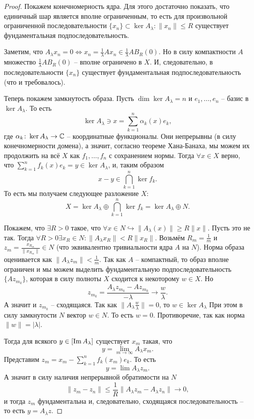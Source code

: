 \begin{proof}
    Покажем конечномерность ядра.
    Для этого достаточно показать, что единичный шар является вполне ограниченным, то есть для произвольной ограниченной последовательности $\{x_n\} \subset \ker A_\lambda\colon \|x_n\| \leq R$ существует фундаментальная подпоследовательность.

    Заметим, что $A_\lambda x_n = 0 \Longleftrightarrow x_n = \frac{1}{\lambda}Ax_n \in \frac{1}{\lambda} AB_R(0)$.
    Но в силу компактности $A$ множество $\frac{1}{\lambda}AB_R(0)$ -- вполне ограничено в $X$.
    И, следовательно, в последовательности $\{x_n\}$ существует фундаментальная подпоследовательность (что и требовалось).

    Теперь покажем замкнутость образа.
    Пусть $\dim \ker A_\lambda = n$ и $e_1, \ldots, e_n$ -- базис в $\ker A_\lambda$.
    То есть 
    \[
        \ker A_\lambda \ni x = \sum_{k = 1}^{n}\alpha_k(x)e_k,
    \]
    где $\alpha_k\colon \ker A_\lambda \to \mathbb{C}$ -- координатные функционалы.
    Они непрерывны (в силу конечномерности домена), а значит, согласно теореме Хана-Банаха, мы можем их продолжить на всё $X$ как $f_1, \ldots, f_n$ с сохранением нормы.
    Тогда $\forall x \in X$ верно, что $\sum_{k = 1}^n f_k(x)e_k = y \in \ker A_\lambda$,
    и, таким образом
    \[
        x - y \in \bigcap_{k = 1}^{n} \ker f_k.
    \]
    То есть мы получаем следующее разложение $X$:
    \[
        X = \ker A_\lambda \oplus \bigcap_{k = 1}^{n} \ker f_k = \ker A_\lambda \oplus N.
    \]
    
    Покажем, что $\exists R > 0$ такое, что $\forall x \in N \hookrightarrow \|A_\lambda(x)\| \geq R\|x\|$. Пусть это не так.
    Тогда $\forall R > 0 \exists x_R \in N\colon \|A_\lambda x_R\| < R\|x_R\|$.
    Возьмём $R_m = \frac{1}{m}$ и $z_m = \frac{x_{R_m}}{\|x_{R_m}\|} \in N$ (что эквивалентно тривиальности ядра $A$ на $N$).
    Норма образа оценивается как $\|A_\lambda z_m\| < \frac{1}{m}$.
    Так как $A$ -- компактный, то образ вполне ограничен и мы можем выделить фундаментальную подпоследовательность $\{Az_{m_k}\}$, которая в силу полноты $X$ сходится к некоторому $w \in X$.
    Но 
    \[
        z_{m_k} = \frac{A_\lambda z_{m_k} - Az_{m_k}}{-\lambda} \rightarrow \frac{w}{\lambda}.
    \]
    А значит и $z_{m_k}$ -- сходящаяся.
    Так как $\|A_\lambda \frac{w}{\lambda}\| = 0$, то $w \in \ker A_\lambda$
    При этом в силу замкнутости $N$ вектор $w \in N$.
    То есть $w = 0$. 
    Противоречие, так как норма $\|w\| = |\lambda|$.

    Тогда для всякого $y \in [\operatorname{Im} A_\lambda]$ существует $x_m$ такая, что
    \[
        y = \lim_{m \rightarrow \infty} A_\lambda x_m.
    \]
    Представим $z_m = x_m - \sum_{k = 1}^{n} f_k(x_m)e_k$.
    То есть
    \[
        y = \lim A_\lambda z_m.
    \]
    А значит в силу наличия непрерывной обратимости на $N$
    \[
        \|z_m - z_n\| \leq \frac{1}{R}\|A_\lambda z_m - A_\lambda z_n\| \rightarrow 0,
    \]
    и тогда $z_m$ фундаментальна и, следовательно, сходящаяся последовательность -- то есть $y = A_\lambda z$.
\end{proof}
